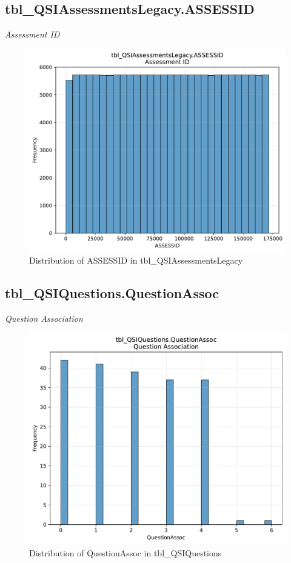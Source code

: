 \subsection{tbl\_QSIAssessmentsLegacy.ASSESSID}
\textit{Assessment ID}

\begin{figure}[htbp]
\centering
\includegraphics[width=\textwidth]{figures/dbo_tbl_QSIAssessmentsLegacy_ASSESSID.pdf}
\caption{Distribution of ASSESSID in tbl\_QSIAssessmentsLegacy}
\end{figure}\newpage

\subsection{tbl\_QSIQuestions.QuestionAssoc}
\textit{Question Association}

\begin{figure}[htbp]
\centering
\includegraphics[width=\textwidth]{figures/dbo_tbl_QSIQuestions_QuestionAssoc.pdf}
\caption{Distribution of QuestionAssoc in tbl\_QSIQuestions}
\end{figure}\newpage

